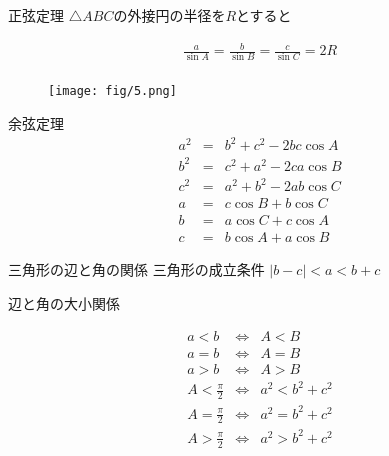 \documentclass[aspectratio=169, 12pt]{beamer}
\begin{document}
\begin{frame}{正弦定理}
    $\bigtriangleup ABC$の外接円の半径を$R$とすると\par
    \begin{eqnarray*}
        \frac{a}{\sin A}=\frac{b}{\sin B}=\frac{c}{\sin C}=2R \\
    \end{eqnarray*}
    \begin{figure}[htbp]
        \begin{center}
            \texttt{[image: fig/5.png]}
        \end{center}
    \end{figure}

\end{frame}
\begin{frame}{余弦定理}
    \begin{eqnarray*}
        a^2&=&b^2+c^2-2bc\cos A \\
        b^2&=&c^2+a^2-2ca\cos B \\
        c^2&=&a^2+b^2-2ab\cos C \\
        a&=&c\cos B+ b\cos C \\
        b&=&a\cos C+ c\cos A \\
        c&=&b\cos A+a\cos B
    \end{eqnarray*}
\end{frame}
\begin{frame}{三角形の辺と角の関係}
    三角形の成立条件 $|b-c|<a<b+c$ \par
    辺と角の大小関係 \par
    \begin{eqnarray*}
        a<b &\Leftrightarrow& A<B \\
        a=b &\Leftrightarrow& A=B \\
        a>b &\Leftrightarrow& A>B \\
        A<\frac{\pi}{2} &\Leftrightarrow& a^2<b^2+c^2 \\
        A=\frac{\pi}{2} &\Leftrightarrow& a^2=b^2+c^2 \\
        A>\frac{\pi}{2} &\Leftrightarrow& a^2>b^2+c^2 \\
    \end{eqnarray*}
\end{frame}
\end{document}
